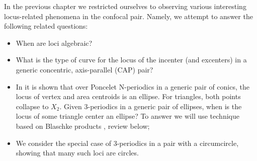 In the previous chapter we restricted ourselves to observing various interesting locus-related phenomena in the confocal pair. 
Namely, we attempt to answer the following related questions:

\begin{itemize}
    \item When are loci algebraic?
    \item What is the type of curve for the locus of the incenter (and excenters) in a generic concentric, axis-parallel (CAP) pair?
    \item In \cite{sergei2016-com} it is shown that over Poncelet N-periodics in a generic pair of conics, the locus of vertex and area centroids is an ellipse. For triangles, both points collapse to $X_2$. Given 3-periodics in a generic pair of ellipses, when is the locus of some triangle center an ellipse? To answer we will use technique based on Blaschke products \cite{daepp-2019}, review below;
    \item We consider the special case of 3-periodics in a pair with a circumcircle, showing that many such loci are circles.
\end{itemize}